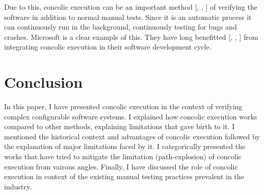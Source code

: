 \documentclass[ runningheads,
               a4paper]{llncs}
\begin{document}
Due to this, concolic execution can be an important method [\cite{fsct2019}, \cite{csallner2008dysy}, \cite{christakis2016guiding}] of verifying the software in addition to normal manual tests. Since it is an automatic process it can continuously run in the background, continuously testing for bugs and crashes. Microsoft is a clear example of this. They have long benefitted [\cite{godefroid2008automated}, \cite{godefroid2012sage}, \cite{bounimova2013billions}] from integrating concolic execution in their software development cycle.




\section{Conclusion}
In this paper, I have presented concolic execution in the context of verifying complex configurable software systems. I explained how concolic execution works compared to other methods, explaining limitations that gave birth to it. I mentioned the historical context and advantages of concolic execution followed by the explanation of major limitations faced by it. I categorically presented the works that have tried to mitigate the limitation (path-explosion) of concolic execution from vairous angles. Finally, I have discussed the role of concolic execution in context of the existing manual testing practices prevalent in the industry.











  
\end{document}
